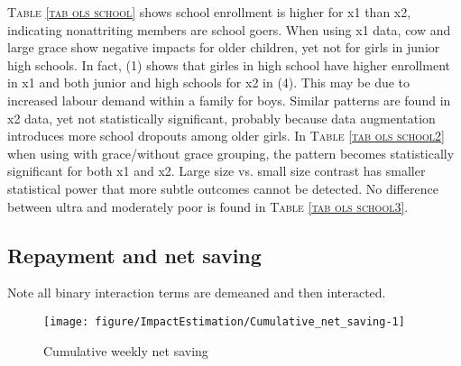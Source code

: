 \begin{palepinkleftbar}
\begin{finding}
\textsc{\small Table \ref{tab ols school}} shows school enrollment is higher for \textsf{x1} than \textsf{x2}, indicating nonattriting members are school goers. When using \textsf{x1} data, \textsf{cow} and \textsf{large grace} show negative impacts for older children, yet not for girls in junior high schools. In fact, (1) shows that girles in high school have higher enrollment in \textsf{x1} and both junior and high schools for \textsf{x2} in (4). This may be due to increased labour demand within a family for boys. Similar patterns are found in \textsf{x2} data, yet not statistically significant, probably because data augmentation introduces more school dropouts among older girls. In \textsc{\small Table \ref{tab ols school2}} when using with grace/without grace grouping, the pattern becomes statistically significant for both \textsf{x1} and \textsf{x2}. Large size vs. small size contrast has smaller statistical power that more subtle outcomes cannot be detected. No difference between ultra and moderately poor is found in \textsc{\small Table \ref{tab ols school3}}.
\end{finding}
\end{palepinkleftbar}


\subsection{Repayment and net saving}

Note all binary interaction terms are demeaned and then interacted.

\begin{Schunk}
\begin{figure}

{\centering \texttt{[image: figure/ImpactEstimation/Cumulative\_net\_saving-1]} 

}

\caption[Cumulative weekly net saving]{Cumulative weekly net saving}\label{Figure Cumulative net saving}
\end{figure}
\end{Schunk}





